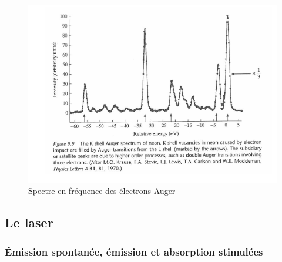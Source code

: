 \begin{figure}[htp]
    \centering
    \includegraphics[scale=1.0]{Images2/Spectre Auger.PNG}
    \caption{Spectre en fréquence des électrons Auger}
    \label{fig:SpectreAuger}
\end{figure}








\subsection{Le laser}

\subsubsection{Émission spontanée, émission et absorption stimulées}




